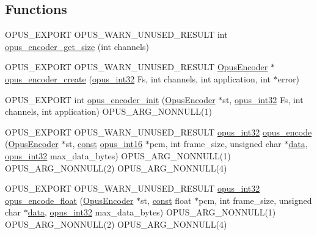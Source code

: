 \subsection*{Functions}
\begin{DoxyCompactItemize}
\item 
O\+P\+U\+S\+\_\+\+E\+X\+P\+O\+RT O\+P\+U\+S\+\_\+\+W\+A\+R\+N\+\_\+\+U\+N\+U\+S\+E\+D\+\_\+\+R\+E\+S\+U\+LT int \hyperlink{group__opus__encoder_ga9ac72d062eca0c77711f5b04b9dcc645}{opus\+\_\+encoder\+\_\+get\+\_\+size} (int channels)
\item 
O\+P\+U\+S\+\_\+\+E\+X\+P\+O\+RT O\+P\+U\+S\+\_\+\+W\+A\+R\+N\+\_\+\+U\+N\+U\+S\+E\+D\+\_\+\+R\+E\+S\+U\+LT \hyperlink{group__opus__encoder_gaf461a3ef2f10c2fe8b994a176f06c9bd}{Opus\+Encoder} $\ast$ \hyperlink{group__opus__encoder_ga8a145618886fed2d6fbc79a4071a939d}{opus\+\_\+encoder\+\_\+create} (\hyperlink{opus__types_8h_aa4d309d6f80b99dbabebc8f98879ab9a}{opus\+\_\+int32} Fs, int channels, int application, int $\ast$error)
\item 
O\+P\+U\+S\+\_\+\+E\+X\+P\+O\+RT int \hyperlink{group__opus__encoder_ga363e90db0f434b2d8fde7dcf989270b1}{opus\+\_\+encoder\+\_\+init} (\hyperlink{group__opus__encoder_gaf461a3ef2f10c2fe8b994a176f06c9bd}{Opus\+Encoder} $\ast$st, \hyperlink{opus__types_8h_aa4d309d6f80b99dbabebc8f98879ab9a}{opus\+\_\+int32} Fs, int channels, int application) O\+P\+U\+S\+\_\+\+A\+R\+G\+\_\+\+N\+O\+N\+N\+U\+LL(1)
\item 
O\+P\+U\+S\+\_\+\+E\+X\+P\+O\+RT O\+P\+U\+S\+\_\+\+W\+A\+R\+N\+\_\+\+U\+N\+U\+S\+E\+D\+\_\+\+R\+E\+S\+U\+LT \hyperlink{opus__types_8h_aa4d309d6f80b99dbabebc8f98879ab9a}{opus\+\_\+int32} \hyperlink{group__opus__encoder_gabbb51305050b64614329637d6eff777c}{opus\+\_\+encode} (\hyperlink{group__opus__encoder_gaf461a3ef2f10c2fe8b994a176f06c9bd}{Opus\+Encoder} $\ast$st, \hyperlink{zconf_8h_a2c212835823e3c54a8ab6d95c652660e}{const} \hyperlink{opus__types_8h_acc9ed7cf60479eb81f9648c6ec27dc26}{opus\+\_\+int16} $\ast$pcm, int frame\+\_\+size, unsigned char $\ast$\hyperlink{jpeglib_8h_aa379dc8ae39e55ae0c431a61a7d2f2bc}{data}, \hyperlink{opus__types_8h_aa4d309d6f80b99dbabebc8f98879ab9a}{opus\+\_\+int32} max\+\_\+data\+\_\+bytes) O\+P\+U\+S\+\_\+\+A\+R\+G\+\_\+\+N\+O\+N\+N\+U\+LL(1) O\+P\+U\+S\+\_\+\+A\+R\+G\+\_\+\+N\+O\+N\+N\+U\+LL(2) O\+P\+U\+S\+\_\+\+A\+R\+G\+\_\+\+N\+O\+N\+N\+U\+LL(4)
\item 
O\+P\+U\+S\+\_\+\+E\+X\+P\+O\+RT O\+P\+U\+S\+\_\+\+W\+A\+R\+N\+\_\+\+U\+N\+U\+S\+E\+D\+\_\+\+R\+E\+S\+U\+LT \hyperlink{opus__types_8h_aa4d309d6f80b99dbabebc8f98879ab9a}{opus\+\_\+int32} \hyperlink{group__opus__encoder_ga4d7243152a1bc6bf4953d1d5c1e530c6}{opus\+\_\+encode\+\_\+float} (\hyperlink{group__opus__encoder_gaf461a3ef2f10c2fe8b994a176f06c9bd}{Opus\+Encoder} $\ast$st, \hyperlink{zconf_8h_a2c212835823e3c54a8ab6d95c652660e}{const} float $\ast$pcm, int frame\+\_\+size, unsigned char $\ast$\hyperlink{jpeglib_8h_aa379dc8ae39e55ae0c431a61a7d2f2bc}{data}, \hyperlink{opus__types_8h_aa4d309d6f80b99dbabebc8f98879ab9a}{opus\+\_\+int32} max\+\_\+data\+\_\+bytes) O\+P\+U\+S\+\_\+\+A\+R\+G\+\_\+\+N\+O\+N\+N\+U\+LL(1) O\+P\+U\+S\+\_\+\+A\+R\+G\+\_\+\+N\+O\+N\+N\+U\+LL(2) O\+P\+U\+S\+\_\+\+A\+R\+G\+\_\+\+N\+O\+N\+N\+U\+LL(4)

\end{DoxyCompactItemize}
